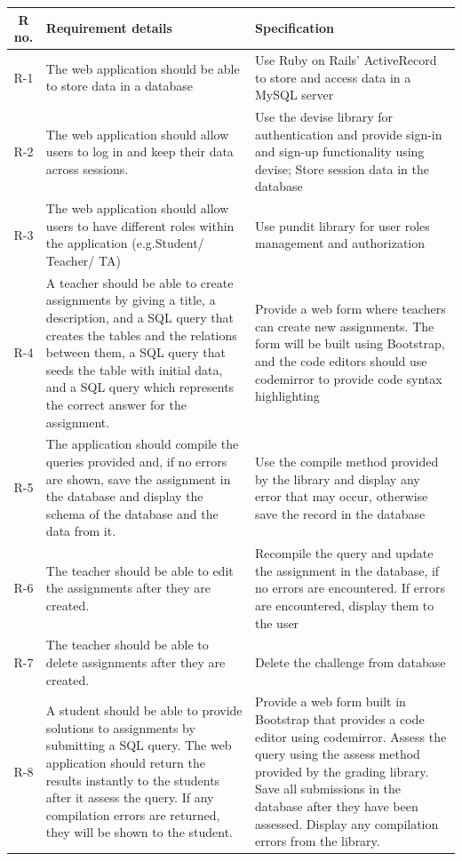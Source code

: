 \begin{tabularx}{\textwidth}{|c|Y|Y|}
  \hline
  \textbf{R no.} & \textbf{Requirement details} & \textbf{Specification} \\\hline
  \endhead
  R-1 & The web application should be able to store data in a database & Use Ruby on Rails' ActiveRecord to store and access data in a MySQL server \\\hline
  R-2 & The web application should allow users to log in and keep their data across sessions. & Use the devise library for authentication and provide sign-in and sign-up functionality using devise; Store session data in the database \\\hline
  R-3 &  The web application should allow users to have different roles within the application (e.g.Student/ Teacher/ TA) & Use pundit library for user roles management and authorization\\\hline
  R-4 &  A teacher should be able to create assignments by giving a title, a description, and a SQL query that creates the tables and the relations between them, a SQL query that seeds the table with initial data, and a SQL query which represents the correct answer for the assignment. & Provide a web form where teachers can create new assignments. The form will be built using Bootstrap, and the code editors should use codemirror to provide code syntax highlighting \\\hline
  R-5 &  The application should compile the queries provided and, if no errors are shown, save the assignment in the database and display the schema of the database and the data from it. & Use the compile method provided by the library and display any error that may occur, otherwise save the record in the database \\\hline
  R-6 & The teacher should be able to edit the assignments after they are created. & Recompile the query and update the assignment in the database, if no errors are encountered. If errors are encountered, display them to the user \\\hline
  R-7 & The teacher should be able to delete assignments after they are created. & Delete the challenge from database \\\hline
  R-8 & A student should be able to provide solutions to assignments by submitting a SQL query. The web application should return the results instantly to the students after it assess the query. If any compilation errors are returned, they will be shown to the student. & Provide a web form built in Bootstrap that provides a code editor using codemirror. Assess the query using the assess method provided by the grading library. Save all submissions in the database after they have been assessed. Display any compilation errors from the library. \\\hline

\end{tabularx}
